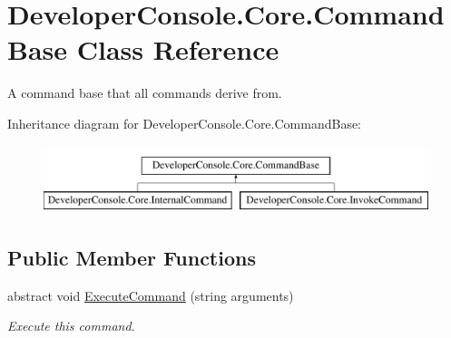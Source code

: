 \hypertarget{class_developer_console_1_1_core_1_1_command_base}{}\section{Developer\+Console.\+Core.\+Command\+Base Class Reference}
\label{class_developer_console_1_1_core_1_1_command_base}


A command base that all commands derive from.  


Inheritance diagram for Developer\+Console.\+Core.\+Command\+Base\+:\begin{figure}[H]
\begin{center}
\leavevmode
\includegraphics[height=2.000000cm]{class_developer_console_1_1_core_1_1_command_base}
\end{center}
\end{figure}
\subsection*{Public Member Functions}
\begin{DoxyCompactItemize}
\item 
abstract void \hyperlink{class_developer_console_1_1_core_1_1_command_base_ab68054239b7e3d2a47029839f90d59ca}{Execute\+Command} (string arguments)
\begin{DoxyCompactList}\small\item\em Execute this command. \end{DoxyCompactList}\end{DoxyCompactItemize}
